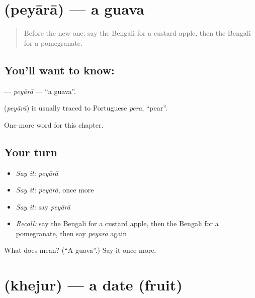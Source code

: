 \section[\texorpdfstring{\bn{পেয়ারা} (peyārā)}{পেয়ারা (peyārā)}]{ (peyārā) — a guava}

\label{lesson:BN-C204-peyara}



\begin{quote}
Before the new one: say the Bengali for a custard apple, then the Bengali for a pomegranate.
\end{quote}

\subsection*{You'll want to know: }
\textbf{} — \emph{peyārā} — \textquotedblleft{}a guava\textquotedblright{}.

\begin{cousinweb}
\textbf{} (\emph{peyārā}) is usually traced to Portuguese \emph{pera}, \textquotedblleft{}pear\textquotedblright{}.
\end{cousinweb}

\begin{grammarlens}[title={What you've built}]
One more word for this chapter.
\end{grammarlens}

\subsection*{Your turn}
\begin{itemize}
\raggedright
  \item \emph{Say it:} \emph{peyārā}
  \item \emph{Say it:} \emph{peyārā}, once more
  \item \emph{Say it:} say \emph{peyārā}
  \item \emph{Recall:} say the Bengali for a custard apple, then the Bengali for a pomegranate, then say \emph{peyārā} again
\end{itemize}

\begin{tcolorbox}[breakable,colback=teal!4,colframe=teal!35!black,title={Before you move on}]
What does  mean? (\textquotedblleft{}A guava\textquotedblright{}.) Say it once more.
\end{tcolorbox}
\section[\texorpdfstring{\bn{খেজুর} (khejur)}{খেজুর (khejur)}]{ (khejur) — a date (fruit)}

